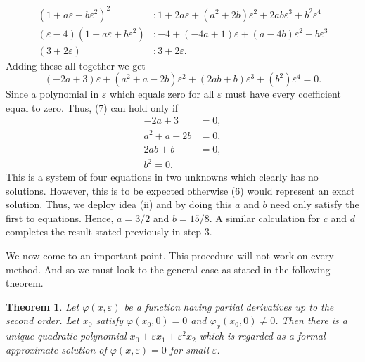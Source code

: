 \documentclass{article}
\newtheorem{theorem}{Theorem}[section]
\theoremstyle{definition}
\theoremstyle{remark}
\theoremstyle{definition}
\begin{document}
        \begin{equation*}
            \begin{split}
                (1+a\varepsilon+b\varepsilon^2)^2&: 1+2a\varepsilon+(a^2+2b)\varepsilon^2+2ab\varepsilon^3+b^2\varepsilon^4 \\
                (\varepsilon-4)(1+a\varepsilon+b\varepsilon^2)&:-4+(-4a+1)\varepsilon+(a-4b)\varepsilon^2+b\varepsilon^3 \\
                (3+2\varepsilon)&: 3+2\varepsilon.
            \end{split}
        \end{equation*}
    \noindent Adding these all together we get
        \begin{equation}
            (-2a+3)\varepsilon+(a^2+a-2b)\varepsilon^2+(2ab+b)\varepsilon^3+(b^2)\varepsilon^4=0.
        \end{equation}
    \noindent Since a polynomial in $\varepsilon$ which equals zero for all $\varepsilon$ must have every coefficient equal to zero. Thus, (7) can hold only if 
        \begin{equation*}
            \begin{split}
                -2a+3&=0, \\
                a^2+a-2b&=0,\\
                2ab+b&=0,\\
                b^2=0.
            \end{split}
        \end{equation*}
    \noindent This is a system of four equations in two unknowns which clearly has no solutions. However, this is to be expected otherwise (6) would represent an exact solution. Thus, we deploy idea (ii) and by doing this $a$ and $b$ need only satisfy the first to equations. Hence, $a=3/2$ and $b=15/8$. A similar calculation for $c$ and $d$ completes the result stated previously in step 3.\par We now come to an important point. This procedure will not work on every method. And so we must look to the general case as stated in the following theorem.
        \begin{theorem}
            Let $\varphi(x,\varepsilon)$ be a function having partial derivatives up to the second order. Let $x_0$ satisfy $\varphi(x_0,0)=0$ and $\varphi_x(x_0,0)\neq 0$. Then there is a unique quadratic polynomial $x_0+\varepsilon x_1+\varepsilon^2x_2$ which is regarded as a formal approximate solution of $\varphi(x,\varepsilon)=0$ for small $\varepsilon$.
        \end{theorem} 
        
\end{document}
